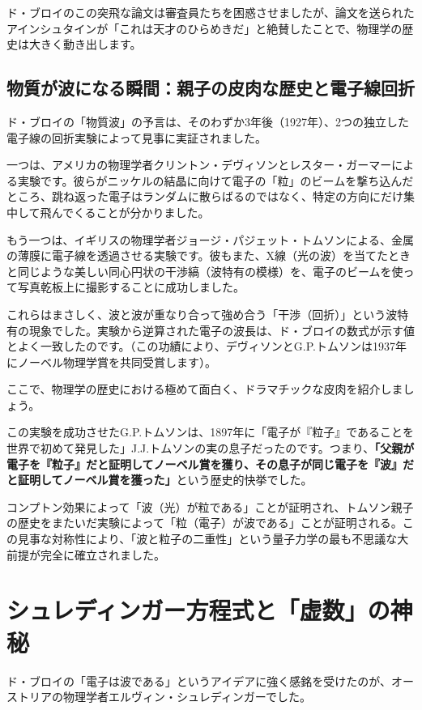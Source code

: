 ド・ブロイのこの突飛な論文は審査員たちを困惑させましたが、論文を送られたアインシュタインが「これは天才のひらめきだ」と絶賛したことで、物理学の歴史は大きく動き出します。

\subsection{物質が波になる瞬間：親子の皮肉な歴史と電子線回折}

ド・ブロイの「物質波」の予言は、そのわずか3年後（1927年）、2つの独立した電子線の回折実験によって見事に実証されました。

一つは、アメリカの物理学者クリントン・デヴィソンとレスター・ガーマーによる実験です。彼らがニッケルの結晶に向けて電子の「粒」のビームを撃ち込んだところ、跳ね返った電子はランダムに散らばるのではなく、特定の方向にだけ集中して飛んでくることが分かりました。

もう一つは、イギリスの物理学者ジョージ・パジェット・トムソンによる、金属の薄膜に電子線を透過させる実験です。彼もまた、X線（光の波）を当てたときと同じような美しい同心円状の干渉縞（波特有の模様）を、電子のビームを使って写真乾板上に撮影することに成功しました。

これらはまさしく、波と波が重なり合って強め合う「干渉（回折）」という波特有の現象でした。実験から逆算された電子の波長は、ド・ブロイの数式が示す値とよく一致したのです。（この功績により、デヴィソンとG.P.トムソンは1937年にノーベル物理学賞を共同受賞します）。

ここで、物理学の歴史における極めて面白く、ドラマチックな皮肉を紹介しましょう。

この実験を成功させたG.P.トムソンは、1897年に「電子が『粒子』であることを世界で初めて発見した」J.J.トムソンの実の息子だったのです。つまり、\textbf{「父親が電子を『粒子』だと証明してノーベル賞を獲り、その息子が同じ電子を『波』だと証明してノーベル賞を獲った」}という歴史的快挙でした。

コンプトン効果によって「波（光）が粒である」ことが証明され、トムソン親子の歴史をまたいだ実験によって「粒（電子）が波である」ことが証明される。この見事な対称性により、「波と粒子の二重性」という量子力学の最も不思議な大前提が完全に確立されました。

\section{シュレディンガー方程式と「虚数」の神秘}

ド・ブロイの「電子は波である」というアイデアに強く感銘を受けたのが、オーストリアの物理学者エルヴィン・シュレディンガーでした。

